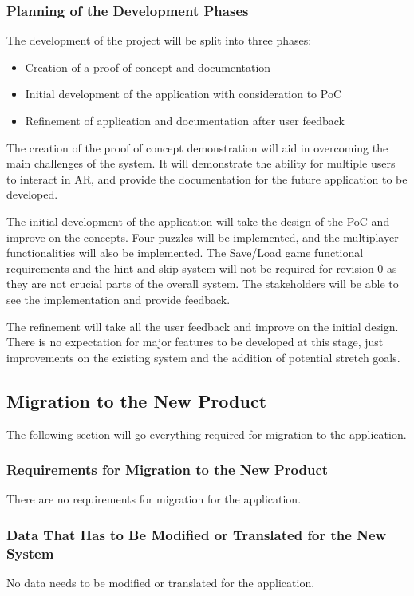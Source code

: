 \documentclass[12pt]{article}
\begin{document}

\subsubsection{Planning of the Development Phases}
The development of the project will be split into three phases:
\begin{itemize}
    \item Creation of a proof of concept and documentation
    \item Initial development of the application with consideration to PoC
    \item Refinement of application and documentation after user feedback
\end{itemize}
The creation of the proof of concept demonstration will aid in overcoming the main challenges of the system. It will demonstrate the ability for multiple users to interact in AR, and provide the documentation for the future application to be developed.

The initial development of the application will take the design of the PoC and improve on the concepts. Four puzzles will be implemented, and the multiplayer functionalities will also be implemented. The Save/Load game functional requirements and the hint and skip system will not be required for revision 0 as they are not crucial parts of the overall system. The stakeholders will be able to see the implementation and provide feedback. 

The refinement will take all the user feedback and improve on the initial design. There is no expectation for major features to be developed at this stage, just improvements on the existing system and the addition of potential stretch goals. 

\subsection{Migration to the New Product}
The following section will go everything required for migration to the application.

\subsubsection{Requirements for Migration to the New Product}
There are no requirements for migration for the application.

\subsubsection{Data That Has to Be Modified or Translated for the New System}
No data needs to be modified or translated for the application.
\end{document}
